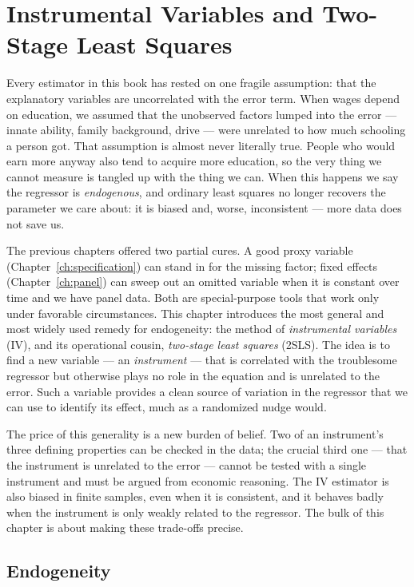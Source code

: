 \chapter{Instrumental Variables and Two-Stage Least Squares}
\label{ch:iv}

Every estimator in this book has rested on one fragile assumption: that the explanatory variables are uncorrelated with the error term. When wages depend on education, we assumed that the unobserved factors lumped into the error --- innate ability, family background, drive --- were unrelated to how much schooling a person got. That assumption is almost never literally true. People who would earn more anyway also tend to acquire more education, so the very thing we cannot measure is tangled up with the thing we can. When this happens we say the regressor is \emph{endogenous}, and ordinary least squares no longer recovers the parameter we care about: it is biased and, worse, inconsistent --- more data does not save us.

The previous chapters offered two partial cures. A good proxy variable (Chapter~\ref{ch:specification}) can stand in for the missing factor; fixed effects (Chapter~\ref{ch:panel}) can sweep out an omitted variable when it is constant over time and we have panel data. Both are special-purpose tools that work only under favorable circumstances. This chapter introduces the most general and most widely used remedy for endogeneity: the method of \emph{instrumental variables} (IV), and its operational cousin, \emph{two-stage least squares} (2SLS). The idea is to find a new variable --- an \emph{instrument} --- that is correlated with the troublesome regressor but otherwise plays no role in the equation and is unrelated to the error. Such a variable provides a clean source of variation in the regressor that we can use to identify its effect, much as a randomized nudge would.

The price of this generality is a new burden of belief. Two of an instrument's three defining properties can be checked in the data; the crucial third one --- that the instrument is unrelated to the error --- cannot be tested with a single instrument and must be argued from economic reasoning. The IV estimator is also biased in finite samples, even when it is consistent, and it behaves badly when the instrument is only weakly related to the regressor. The bulk of this chapter is about making these trade-offs precise.

\section{Endogeneity}

